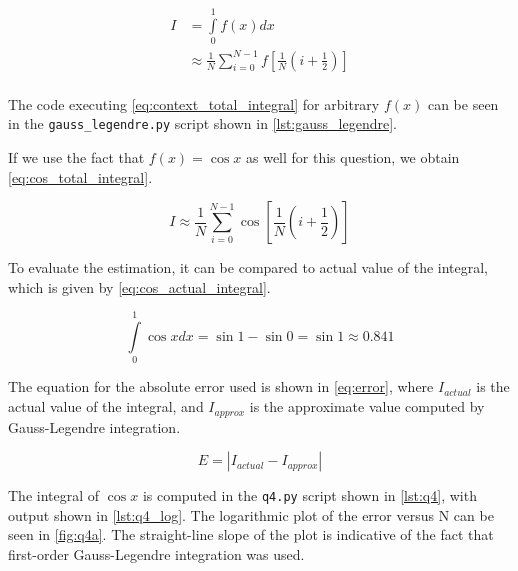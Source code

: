 \documentclass[a4paper,titlepage]{article}
\newcommand{\code}[1]{\texttt{#1}}
\begin{document}
	\begin{equation} \label{eq:context_total_integral}
		\begin{split}
			I &= \int\limits_{0}^{1} f(x) dx  \\
			&\approx \frac{1}{N} \sum_{i=0}^{N-1} f\left[ \frac{1}{N} \left(i + \frac{1}{2} \right) \right] \\
		\end{split}
	\end{equation}
	
	The code executing \cref{eq:context_total_integral} for arbitrary $f(x)$ can be seen in the \code{gauss\_legendre.py} script shown in \cref{lst:gauss_legendre}.
	
	If we use the fact that $f(x) = \cos x$ as well for this question, we obtain \cref{eq:cos_total_integral}.
	
	\begin{equation} \label{eq:cos_total_integral}
		I \approx \frac{1}{N} \sum_{i=0}^{N-1} \cos \left[ \frac{1}{N} \left(i + \frac{1}{2} \right) \right]
	\end{equation}
	
	To evaluate the estimation, it can be compared to actual value of the integral, which is given by \cref{eq:cos_actual_integral}.
	
	\begin{equation} \label{eq:cos_actual_integral}
		\int\limits_{0}^{1} \cos x dx = \sin 1 - \sin 0 = \sin 1 \approx 0.841
	\end{equation}
	
	The equation for the absolute error used is shown in \cref{eq:error}, where $I_{actual}$ is the actual value of the integral, and $I_{approx}$ is the approximate value computed by Gauss-Legendre integration.
	
	\begin{equation} \label{eq:error}
		E = | I_{actual}  - I_{approx}|
	\end{equation}
	
 	The integral of $\cos x$ is computed in the \code{q4.py} script shown in \cref{lst:q4}, with output shown in \cref{lst:q4_log}. The logarithmic plot of the error versus N can be seen in \cref{fig:q4a}. The straight-line slope of the plot is indicative of the fact that first-order Gauss-Legendre integration was used.
	
\end{document}
